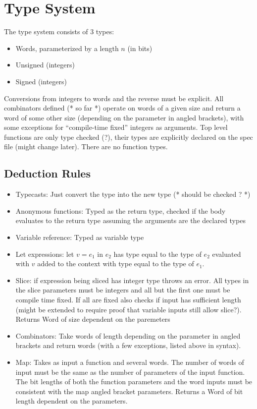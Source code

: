 \documentclass{article}
\begin{document}
  \section{Type System}
  The type system consists of 3 types:
  \begin{itemize}
  \item Words, parameterized by a length $n$ (in bits)
  \item Unsigned (integers)
  \item Signed (integers)
  \end{itemize}
  Conversions from integers to words and the reverse must be explicit.  All
  combinators defined (* so far *) operate on words of a given size and return a
  word of some other size (depending on the parameter in angled brackets), with
  some exceptions for ``compile-time fixed'' integers as arguments.  Top level
  functions are only type checked (?), their types are explicitly declared on
  the spec file (might change later). There are no function types.
  \subsection{Deduction Rules}
  \begin{itemize}
  \item Typecasts: Just convert the type into the new type (* should be checked
    ? *)
  \item Anonymous functions: Typed as the return type, checked if the body
    evaluates to the return type assuming the arguments are the declared types
  \item Variable reference: Typed as variable type 
  \item Let expressions: let $v=e_1$ in $e_2$ has type equal to the type of
    $e_2$ evaluated with $v$ added to the context with type equal to the type of
    $e_1$.
  \item Slice: if expression being sliced has integer type throws an error. All
    types in the slice parameters must be integers and all but the first one
    must be compile time fixed. If all are fixed also checks if input has
    sufficient length (might be extended to require proof that variable inputs
    still allow slice?). Returns Word of size dependent on the paremeters
  \item Combinators: Take words of length depending on the parameter in angled
    brackets and return words (with a few exceptions, listed above in syntax).
  \item Map: Takes as input a function and several words. The number of words of
    input must be the same as the number of parameters of the input
    function. The bit lengths of both the function parameters and the word
    inputs must be consistent with the map angled bracket parameters. Returns a
    Word of bit length dependent on the parameters.
  \end{itemize}
\end{document}
